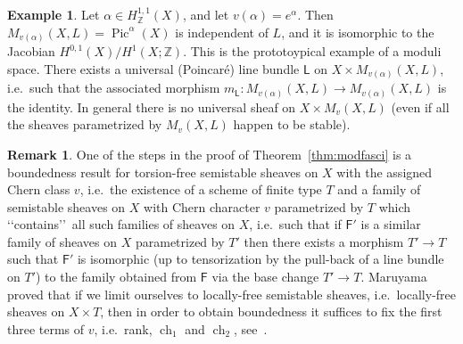 \documentclass[11pt]{amsart}
\newcommand{\ZZ}{{\mathbb Z}}
\def\sF{{\mathsf F}}
\DeclareMathOperator{\ch}{ch}
\DeclareMathOperator{\Pic}{Pic}
\theoremstyle{definition}
\newtheorem{rmk}[lmm]{Remark}
\newtheorem{expl}[lmm]{Example}
\theoremstyle{remark}
\begin{document}
%
\begin{expl}
%
Let $\alpha\in H^{1,1}_{\ZZ}(X)$, and let $v(\alpha)=e^{\alpha}$. Then $M_{v(\alpha)}(X,L)=\Pic^{\alpha}(X)$ is independent of $L$, and it is  isomorphic to the Jacobian $H^{0,1}(X)/H^1(X;\ZZ)$. This is the prototoypical example of a moduli space. There exists a universal (Poincar\'e) line bundle $\mathsf L$ on 
$X\times M_{v(\alpha)}(X,L)$, i.e.~such that the associated morphism  $m_{\mathsf L}\colon M_{v(\alpha)}(X,L)\to M_{v(\alpha)}(X,L)$ is the identity. In general there is no  universal sheaf on $X\times M_{v}(X,L)$ (even if all the sheaves parametrized by $M_{v}(X,L)$ happen to be stable). 
%
\end{expl}
%

%
\begin{rmk}
%
One of the steps in the proof of Theorem~\ref{thm:modfasci} is a boundedness result for torsion-free semistable sheaves on $X$  with the assigned Chern class $v$, i.e.~the existence of a scheme of finite type $T$ and 
a family of semistable sheaves on $X$ with Chern character $v$ parametrized by $T$
 which \lq\lq contains\rq\rq\ all such families of sheaves on $X$, i.e.~such that if  $\sF'$ is a similar family of sheaves on $X$ 
parametrized by $ T'$ 
then there exists a morphism   $T'\to T$ such that  $\sF'$ is isomorphic (up to tensorization by the pull-back of a line bundle on $T'$) to the family obtained from $\sF$  via the base change $T'\to T$.  Maruyama proved that if we limit ourselves to locally-free semistable sheaves, 
i.e.~locally-free sheaves on $X\times T$, then in order 
to obtain boundedness it suffices to fix the first three terms of $v$, i.e.~rank, $\ch_1$ and $\ch_2$, 
see~\cite{maruyama:fascilimitati}.
%
\end{rmk}
%
%
\end{document}
